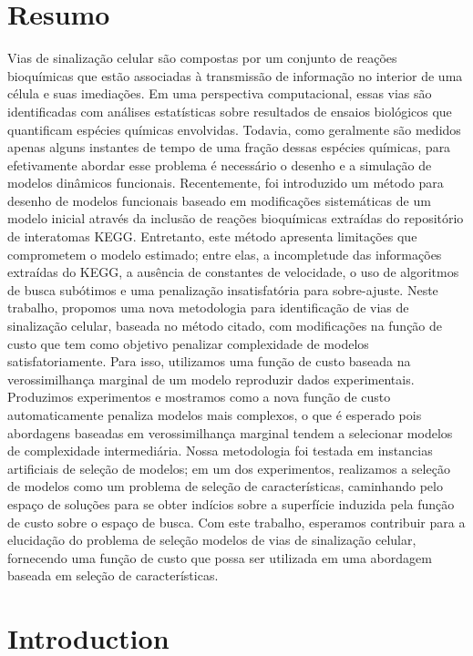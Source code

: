 \documentclass[12pt, twoside]{report}
\numberwithin{mydefinition}{section}
\numberwithin{mytheorem}{section}
\numberwithin{mylemma}{section}
\numberwithin{corollary}{section}
\begin{document}
\chapter*{Resumo}
Vias de sinalização celular são compostas por um conjunto de reações
bioquímicas que estão associadas à transmissão de informação no interior
de uma célula e suas imediações. Em uma perspectiva computacional, essas
vias são identificadas com análises estatísticas sobre resultados de 
ensaios biológicos que quantificam espécies químicas envolvidas.
Todavia, como geralmente são medidos apenas alguns instantes de tempo de
uma fração dessas espécies químicas, para efetivamente abordar esse
problema é necessário o desenho e a simulação de modelos dinâmicos
funcionais. Recentemente, foi introduzido um método para desenho de
modelos funcionais baseado em modificações sistemáticas de um modelo
inicial
através da inclusão de reações bioquímicas extraídas do repositório de
interatomas KEGG. Entretanto, este método apresenta limitações que
comprometem o modelo estimado; entre elas, a incompletude das
informações extraídas do KEGG, a ausência de constantes de velocidade, o
uso de algoritmos de busca subótimos e uma penalização insatisfatória
para sobre-ajuste. Neste trabalho, propomos uma nova metodologia para
identificação de vias de sinalização celular, baseada no método citado,
com modificações na função de custo que tem como objetivo penalizar
complexidade de modelos satisfatoriamente. Para isso, utilizamos uma
função de custo baseada na verossimilhança marginal de um modelo 
reproduzir dados experimentais. Produzimos experimentos e mostramos como
a nova função de custo automaticamente penaliza modelos mais complexos,
o que é esperado pois abordagens baseadas em verossimilhança marginal
tendem a selecionar modelos de complexidade intermediária. Nossa
metodologia foi testada em instancias artificiais de seleção de modelos;
em um dos experimentos, realizamos a seleção de modelos como um problema
de seleção de características, caminhando pelo espaço de soluções para
se obter indícios sobre a superfície induzida pela função de custo sobre
o espaço de busca. Com este trabalho, esperamos contribuir para a 
elucidação do problema de seleção modelos de vias de sinalização celular,
fornecendo uma função de custo que possa ser utilizada em uma abordagem
baseada em seleção de características.

\tableofcontents

\clearpage
{} 

\nocite{*}
\chapter{Introduction}
\label{chap:intro}

\end{document}

